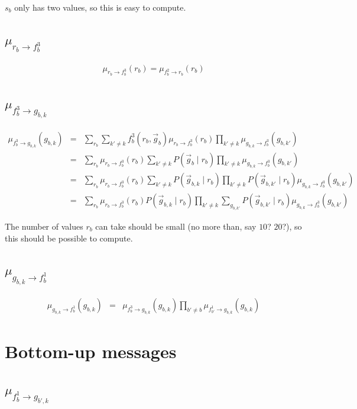 \documentclass[11pt]{article}
\newcommand{\fb}[1]{f_b^{#1}}
\newcommand{\mFbRb}[1]{\mu_{ \fb{#1} \rightarrow r_{b}}}
\newcommand{\mRbFb}[1]{\mu_{ r_{b} \rightarrow  \fb{#1}}}
\newcommand{\mFbGbk}[1]{\mu_{ \fb{#1} \rightarrow g_{b,k}}}
\newcommand{\mGbkFb}[1]{\mu_{  g_{b,k} \rightarrow \fb{#1}}}
\begin{document}
$s_b$ only has two values, so this is easy to compute.

\subsection{$\mRbFb3$}

\begin{eqnarray}
\mRbFb3(r_b)  = \mFbRb2(r_b)
\end{eqnarray}

\subsection{$\mFbGbk3$}

\begin{eqnarray}
\mFbGbk3(g_{b,k}) &=& \sum_{r_b} \sum_{k' \neq k} \fb3(r_b,\vec{g}_b) \mRbFb3(r_b) \prod_{k' \neq k} \mGbkFb3(g_{b,k'}) \\
&=& \sum_{r_b} \mRbFb3(r_b) \sum_{k' \neq k}P(\vec{g}_b \mid r_b)  \prod_{k' \neq k}  \mGbkFb3(g_{b,k'}) \\
&=& \sum_{r_b} \mRbFb3(r_b) \sum_{k' \neq k} P(\vec{g}_{b,k} \mid r_b)  \prod_{k' \neq k} P(\vec{g}_{b,k'} \mid r_b)  \mGbkFb3(g_{b,k'}) \\
&=& \sum_{r_b} \mRbFb3(r_b)  P(\vec{g}_{b,k} \mid r_b) \prod_{k' \neq k} \sum_{g_{b,k'}}  P(\vec{g}_{b,k'} \mid r_b)  \mGbkFb3(g_{b,k'})
\end{eqnarray}

The number of values $r_b$ can take should be small (no more than, say $10$? $20$?), so this should be possible to compute.

\subsection{$\mGbkFb1$}

\begin{eqnarray}
\mGbkFb1(g_{b,k}) &=& \mFbGbk3(g_{b,k}) \prod_{b' \neq b} \mu_{f_{b'}^1 \rightarrow g_{b,k}}(g_{b,k})
\end{eqnarray}

\section{Bottom-up messages}


\subsection{$\mu_{\fb1 \rightarrow g_{b',k}}$}
\end{document}
